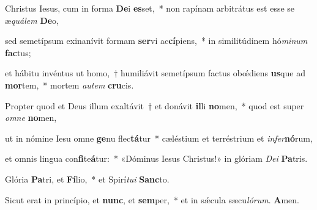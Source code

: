 \item Christus Iesus, cum in forma \textbf{De}i \textbf{es}set,~* non rapínam arbitrátus est esse se æ\textit{quálem} \textbf{De}o,

\item sed semetípsum exinanívit formam \textbf{ser}vi ac\textbf{cí}piens,~* in similitúdinem hó\textit{minum} \textbf{fac}tus;

\item et hábitu invéntus ut homo,~† humiliávit semetípsum factus obœ́diens \textbf{us}que ad \textbf{mor}tem,~* mortem \textit{autem} \textbf{cru}cis.

\item Propter quod et Deus illum exaltávit~† et donávit \textbf{il}li \textbf{no}men,~* quod est super \textit{omne} \textbf{no}men,

\item ut in nómine Iesu omne \textbf{ge}nu flec\textbf{tá}tur~* cæléstium et terréstrium et \textit{infer}\textbf{nó}rum,

\item et omnis lingua con\textbf{fi}te\textbf{á}tur:~* «Dóminus Iesus Christus!» in glóriam \textit{Dei} \textbf{Pa}tris.

\item Glória \textbf{Pa}tri, et \textbf{Fí}lio,~* et Spirí\textit{tui} \textbf{Sanc}to.

\item Sicut erat in princípio, et \textbf{nunc}, et \textbf{sem}per,~* et in sǽcula sæcu\textit{lórum}. \textbf{A}men.

